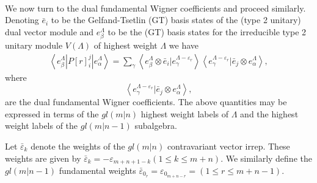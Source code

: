 \documentclass[12pt]{article}
\begin{document}
~~~~~~~~~~~~~~~~~~~~~~~~~~~~~~~~~~~~~~~~~~~~~~~~~~~~~~~~
~~\\
We now turn to the dual fundamental Wigner coefficients and proceed similarly. 
Denoting $\bar{e}_i$ to be the Gelfand-Tsetlin (GT) basis states of the (type 2 unitary) dual vector module and ${e^\Lambda_\beta}$ to be the (GT) basis states for the irreducible type 2 unitary module $V(\Lambda)$ of highest weight $\Lambda$ we have 
\begin{align}
\left\langle e^\Lambda_\beta | P[r]^j_i | e^{\Lambda}_\alpha \right\rangle =
\sum_\gamma \left\langle e^\Lambda_\beta \otimes \bar{e}_i | e^{\Lambda - \varepsilon_r}_\gamma \right\rangle
\left\langle e^{\Lambda-\varepsilon_r}_\gamma | \bar{e}_j \otimes e^\Lambda_\alpha \right\rangle, \label{Pij}
\end{align}
where
$$
\left\langle e^{\Lambda-\varepsilon_r}_\gamma | \bar{e}_j \otimes e^\Lambda_\alpha \right\rangle,
$$
are the dual fundamental Wigner coefficients. The above quantities may be expressed in terms of the $gl(m|n)$ highest weight labels of $\Lambda$ and the highest weight labels of the $gl(m|n-1)$ subalgebra.

Let $\bar{\varepsilon}_k$ denote the weights of the $gl(m|n)$ contravariant vector irrep. These weights are given by $\bar{\varepsilon}_k = -\varepsilon_{m+n+1-k} (1 \leq k \leq m+n)$. We similarly define the $gl(m|n-1)$ fundamental weights $\bar{\varepsilon}_{0_r} =
\varepsilon_{0_{m+n-r}} = (1 \leq r \leq m+n-1) $.
\end{document}

